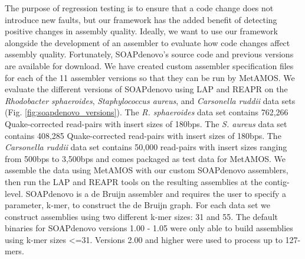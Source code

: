 The purpose of regression testing is to ensure that a code change does not introduce new faults, but our framework has the added benefit of detecting positive changes in assembly quality.
Ideally, we want to use our framework alongside the development of an assembler to evaluate how code changes affect assembly quality.
Fortunately, SOAPdenovo's source code and previous versions are available for download.
We have created custom assembler specification files for each of the 11 assembler versions so that they can be run by MetAMOS\cite{treangen2011metamos}.
We evaluate the different versions of SOAPdenovo using LAP and REAPR on the \emph{Rhodobacter sphaeroides}, \emph{Staphylococcus aureus}, and \emph{Carsonella ruddii} data sets (Fig. \ref{fig:soapdenovo_versions}).
The \emph{R. sphaeroides} data set contains 762,266 Quake-corrected \cite{kelley2010quake} read-pairs with insert sizes of 180bps.
The \emph{S. aureus} data set contains 408,285 Quake-corrected read-pairs with insert sizes of 180bps.
The \emph{Carsonella ruddii} data set contains 50,000 read-pairs with insert sizes ranging from 500bps to 3,500bps and comes packaged as test data for MetAMOS.
We assemble the data using MetAMOS with our custom SOAPdenovo assemblers, then run the LAP and REAPR tools on the resulting assemblies at the contig-level.
SOAPdenovo is a de Bruijn assembler and requires the user to specify a parameter, k-mer, to construct the de Bruijn graph.
For each data set we construct assemblies using two different k-mer sizes: 31 and 55.
The default binaries for SOAPdenovo versions 1.00 - 1.05 were only able to build assemblies using k-mer sizes <=31.
Versions 2.00 and higher were used to process up to 127-mers.

